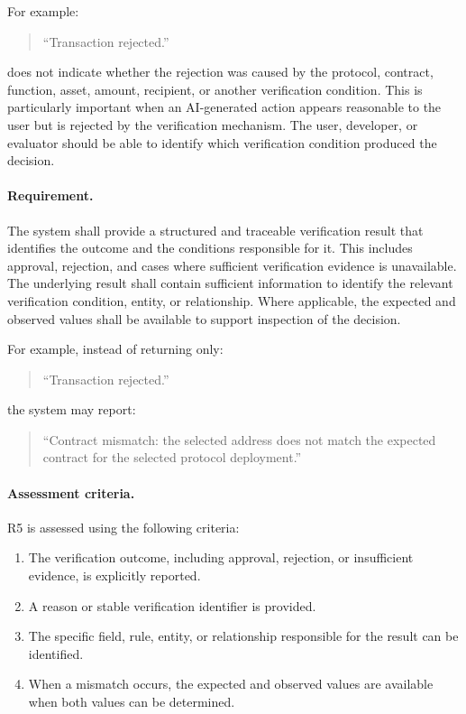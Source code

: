 For example:

\begin{quote}
``Transaction rejected.''
\end{quote}

does not indicate whether the rejection was caused by the protocol, contract,
function, asset, amount, recipient, or another verification condition. This is particularly important when an AI-generated action appears reasonable
to the user but is rejected by the verification mechanism. The user, developer,
or evaluator should be able to identify which verification condition produced
the decision.

\paragraph{Requirement.}

The system shall provide a structured and traceable
verification result that identifies the outcome and
the conditions responsible for it. This includes
approval, rejection, and cases where sufficient
verification evidence is unavailable. The underlying result shall contain sufficient
information to identify the relevant verification
condition, entity, or relationship. Where applicable,
the expected and observed values shall be available
to support inspection of the decision.

For example, instead of returning only:

\begin{quote}
``Transaction rejected.''
\end{quote}

the system may report:

\begin{quote}
``Contract mismatch: the selected address does not match the expected contract
for the selected protocol deployment.''
\end{quote}

\paragraph{Assessment criteria.}

R5 is assessed using the following criteria:

\begin{enumerate}
    
\item[\textbf{C1}] The verification outcome,
including approval, rejection, or insufficient evidence,
is explicitly reported.

    \item[\textbf{C2}] A reason or stable verification identifier is
    provided.

    \item[\textbf{C3}] The specific field, rule, entity, or relationship
    responsible for the result can be identified.

    \item[\textbf{C4}] When a mismatch occurs, the expected and observed
    values are available when both values can be determined.
\end{enumerate}


